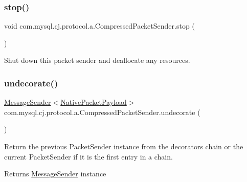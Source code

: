 \mbox{\label{classcom_1_1mysql_1_1cj_1_1protocol_1_1a_1_1_compressed_packet_sender_a5491c16d427d8343f0417b9e5bebd1f1}} 
\subsubsection{\texorpdfstring{stop()}{stop()}}
{\footnotesize\ttfamily void com.\+mysql.\+cj.\+protocol.\+a.\+Compressed\+Packet\+Sender.\+stop (\begin{DoxyParamCaption}{ }\end{DoxyParamCaption})}

Shut down this packet sender and deallocate any resources. \mbox{\label{classcom_1_1mysql_1_1cj_1_1protocol_1_1a_1_1_compressed_packet_sender_a3784dddfd77b45c384a6bb19f67fc2cc}} 
\subsubsection{\texorpdfstring{undecorate()}{undecorate()}}
{\footnotesize\ttfamily \mbox{\hyperlink{interfacecom_1_1mysql_1_1cj_1_1protocol_1_1_message_sender}{Message\+Sender}}$<$\mbox{\hyperlink{classcom_1_1mysql_1_1cj_1_1protocol_1_1a_1_1_native_packet_payload}{Native\+Packet\+Payload}}$>$ com.\+mysql.\+cj.\+protocol.\+a.\+Compressed\+Packet\+Sender.\+undecorate (\begin{DoxyParamCaption}{ }\end{DoxyParamCaption})}

Return the previous Packet\+Sender instance from the decorators chain or the current Packet\+Sender if it is the first entry in a chain.

\begin{DoxyReturn}{Returns}
\mbox{\hyperlink{interfacecom_1_1mysql_1_1cj_1_1protocol_1_1_message_sender}{Message\+Sender}} instance 
\end{DoxyReturn}



